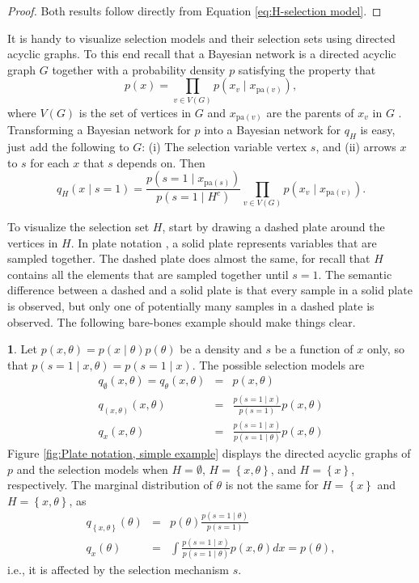 \documentclass{article}
\theoremstyle{plain}
\theoremstyle{definition}
\newtheorem{example}[theorem]{\protect\examplename}
\providecommand{\examplename}{Example}
\begin{document}
\begin{proof}
Both results follow directly from Equation \eqref{eq:H-selection model}.
\end{proof}

It is handy to visualize selection models and their selection sets using directed acyclic graphs. To this end recall that a Bayesian network is a directed acyclic graph $G$ together with a probability
density $p$ satisfying the property that $$p(x)=\prod_{v\in V(G)}p(x_{v}\mid x_{\textrm{pa}(v)}),$$ where $V(G)$ is the set of vertices in $G$ and $x_{\textrm{pa}(v)}$ are the parents of $x_{v}$ in $G$ \citep{Pearl2014}.
Transforming a Bayesian network for $p$ into a Bayesian network for $q_{H}$ is easy, just add the following to $G$: (i) The selection variable vertex $s$, and (ii) arrows $x$ to $s$ for each $x$ that $s$ depends on. Then
\begin{equation}
q_{H}(x\mid s=1)=\frac{p(s=1\mid x_{\textrm{pa}(s)})}{p(s=1\mid H^{c})}\prod_{v\in V(G)}p(x_{v}\mid x_{\textrm{pa}(v)})\label{eq:DAG, selection model}.
\end{equation}

To visualize the selection set $H$, start by drawing a dashed plate around the vertices in $H$. In plate notation \citep{buntine1994operations}, a solid plate represents variables that are sampled together. The
dashed plate does almost the same, for recall that $H$ contains all the elements that are sampled together until $s=1$. The semantic difference between a dashed and a solid plate is that every sample in a solid plate is observed, but only one of potentially many samples in a dashed plate is observed. The following bare-bones example should make things clear.
\begin{example}\label{exa:Marginal density of theta}
Let $p(x,\theta)=p(x\mid\theta)p(\theta)$
be a density and $s$ be a function of $x$ only, so that $p(s=1\mid x,\theta)=p(s=1\mid x)$.
The possible selection models are
\begin{eqnarray*}
q_{\emptyset}(x,\theta) = q_{\theta}(x,\theta) & = & p(x,\theta)\\
q_{(x,\theta)}(x,\theta) & = & \frac{p(s=1\mid x)}{p(s=1)}p(x,\theta)\\
q_{x}(x,\theta) & = & \frac{p(s=1\mid x)}{p(s=1\mid\theta)}p(x,\theta)
\end{eqnarray*}
Figure \ref{fig:Plate notation, simple example} displays the directed acyclic graphs of $p$ and the selection models when $H = \emptyset$, $H=\left\{ x,\theta\right\}$, and $H=\left\{ x\right\}$, respectively. The marginal distribution of $\theta$ is not the same for $H=\left\{ x\right\}$ and $H=\left\{ x,\theta\right\} $, as
\begin{eqnarray*}
q_{\left\{ x,\theta\right\} }(\theta) & = & p(\theta)\frac{p(s=1\mid\theta)}{p(s=1)}\\
q_{x}(\theta) & = & \int\frac{p(s=1\mid x)}{p(s=1\mid\theta)}p(x,\theta)dx=p(\theta),
\end{eqnarray*}
i.e., it is affected by the selection mechanism $s$.
\end{example}
\end{document}
